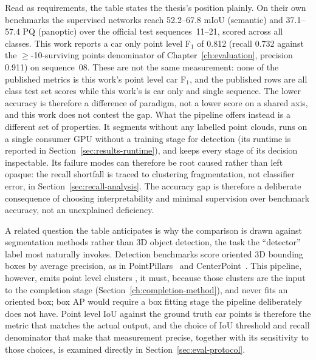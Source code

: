 \documentclass[a4paper,12pt]{report}
\begin{document}
Read as requirements, the table states the thesis's position plainly. On their own
benchmarks the supervised networks reach \numrange{52.2}{67.8} mIoU (semantic) and
\numrange{37.1}{57.4} PQ (panoptic) over the official test sequences~11--21, scored
across all classes. This work reports a car only point level F$_1$ of \num{0.812}
(recall \num{0.732} against the $\ge$-10-surviving points denominator of
Chapter~\ref{ch:evaluation}, precision \num{0.911}) on sequence~08. These are not the
same measurement: none of the published metrics is this work's point level car F$_1$,
and the published rows are all class test set scores while this work's is car only and
single sequence. The lower accuracy is therefore a difference of paradigm, not a lower
score on a shared axis, and this work does not contest the gap. What the pipeline offers
instead is a different set of properties. It
segments without any labelled point clouds, runs on a single consumer GPU without a
training stage for detection (its runtime is reported in Section~\ref{sec:results-runtime}), and keeps every stage of
its decision inspectable. Its
failure modes can therefore be root caused rather than left opaque: the recall
shortfall is traced to clustering fragmentation, not classifier error, in Section~\ref{sec:recall-analysis}.
The accuracy gap is therefore a deliberate consequence of choosing interpretability and
minimal supervision over benchmark accuracy, not an unexplained deficiency.

A related question the table anticipates is why the comparison is drawn against
segmentation methods rather than 3D object detection, the task the ``detector'' label
most naturally invokes. Detection benchmarks score oriented 3D bounding boxes by average
precision, as in PointPillars~\cite{lang2019pointpillars} and
CenterPoint~\cite{yin2021centerpoint}. This pipeline, however, emits point level clusters
, it must, because those clusters are the input to the completion stage (Section~\ref{ch:completion-method}),
and never fits an oriented box; box AP would require a box fitting stage the pipeline
deliberately does not have. Point level IoU against the ground truth car points is
therefore the metric that matches the actual output, and the choice of IoU threshold and
recall denominator that make that measurement precise, together with its sensitivity
to those choices, is examined directly in Section~\ref{sec:eval-protocol}.
\end{document}
